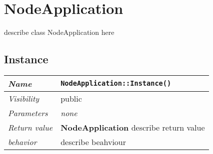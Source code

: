 \chapter{NodeApplication}
describe class NodeApplication here
\section{Instance}
\begin{longtable}{p{3cm} @{\hskip 1cm} p{12cm}}
 \hline
\textit{Name} & \texttt{NodeApplication::Instance()}\\
\hline
 \textit{Visibility} & public\\
\hline
\textit{Parameters} & \textit{none}\\
\hline
\textit{Return value} & \textbf{ NodeApplication} describe return value\\
  \hline
 \textit{behavior} & describe beahviour \\
\hline
\end{longtable} \pagebreak
 